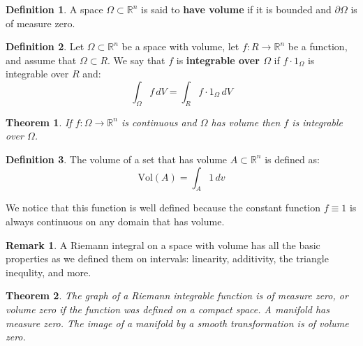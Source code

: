 \documentclass[11pt,a4paper]{article}
\theoremstyle{definition}
\newtheorem{definition}{Definition}[section]
\newtheorem{remark}{Remark}[section]
\theoremstyle{plain}
\newtheorem{theorem}{Theorem}[section]
\newcommand{\R}{\mathbb{R}}
\begin{document}
	\begin{definition}
		A space $\Omega \subset \R^n$ is said to \textbf{have volume}
		if it is bounded and $\partial \Omega$ is of measure zero.
	\end{definition}
	\begin{definition}
		Let $\Omega \subset \R^n$ be a space with volume, let
		$f \colon R \to \R^n$ be a function, and assume that
		$\Omega \subset R$. We say that $f$ is 
		\textbf{integrable over $\Omega$} if $f\cdot1_\Omega$
		is integrable over $R$ and:
		\[
			\int_{\Omega}{f\,dV} = \int_{R}{f\cdot1_\Omega\,dV}
		\]
	\end{definition}
	\begin{theorem}
		If $f \colon \Omega \to \R^n$ is continuous and $\Omega$
		has volume then $f$ is integrable over $\Omega$.
	\end{theorem}
	\begin{definition}
		The volume of a set that has volume $A \subset \R^n$ is 
		defined as:
		\[
			\mathrm{Vol}(A) = \int_{A}{1\,dv}
		\]
	\end{definition}
	We notice that this function is well defined because the constant
	function $f \equiv 1$ is always continuous on any domain that
	has volume.
	\begin{remark}
		A Riemann integral on a space with volume has all the basic
		properties as we defined them on intervals: linearity,
		additivity, the triangle inequlity, and more. 
	\end{remark}
	\begin{theorem}
		The graph of a Riemann integrable function is of measure 
		zero, or volume zero if the function was defined on a
		compact space. A manifold has measure zero. The image
		of a manifold by a smooth transformation is of volume zero. 
	\end{theorem}
	
	
	
	
	
	
	
	
	
	
\end{document}
